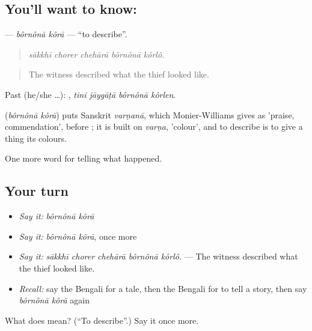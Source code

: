 \subsection*{You'll want to know:  }
\textbf{ } — \emph{bôrnônā kôrā} — \textquotedblleft{}to describe\textquotedblright{}.

\begin{quote}
    
\end{quote}

\begin{quote}
\emph{sākkhī chorer chehārā bôrnônā kôrlô.}
\end{quote}

\begin{quote}
The witness described what the thief looked like.
\end{quote}

Past (he/she …):    , \emph{tini jāygāṭā bôrnônā kôrlen}.

\begin{cousinweb}
\textbf{ } (\emph{bôrnônā kôrā}) puts Sanskrit \emph{varṇanā}, which Monier-Williams gives as 'praise, commendation', before ; it is built on \emph{varṇa}, 'colour', and to describe is to give a thing its colours.
\end{cousinweb}

\begin{grammarlens}[title={What you've built}]
One more word for telling what happened.
\end{grammarlens}

\subsection*{Your turn}
\begin{itemize}
\raggedright
  \item \emph{Say it:} \emph{bôrnônā kôrā}
  \item \emph{Say it:} \emph{bôrnônā kôrā}, once more
  \item \emph{Say it:} \emph{sākkhī chorer chehārā bôrnônā kôrlô.} — The witness described what the thief looked like.
  \item \emph{Recall:} say the Bengali for a tale, then the Bengali for to tell a story, then say \emph{bôrnônā kôrā} again
\end{itemize}

\begin{tcolorbox}[breakable,colback=teal!4,colframe=teal!35!black,title={Before you move on}]
What does   mean? (\textquotedblleft{}To describe\textquotedblright{}.) Say it once more.
\end{tcolorbox}
